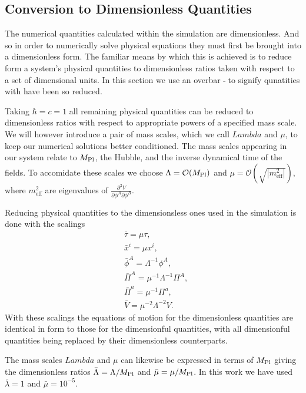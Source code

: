 

\subsection{Conversion to Dimensionless Quantities}
The numerical quantities calculated within the simulation are dimensionless. And so in order to numerically solve physical equations they must first be brought into a dimensionless form. The familiar means by which this is achieved is to reduce form a system's physical quantities to dimensionless ratios taken with respect to a set of dimensional units. In this section we use an overbar $\bar{}$ to signify qunatities with have been so reduced.

Taking $\hbar=c=1$ all remaining physical quantities can be reduced to dimensionless ratios with respect to appropriate powers of a specified mass scale. We will however introduce a pair of mass scales, which we call $Lambda$ and $\mu$, to keep our numerical solutions better conditioned. The mass scales appearing in our system relate to $M_{\mathrm{Pl}}$, the Hubble, and the inverse dynamical time of the fields. To accomidate these scales we choose $\Lambda = \mathcal{O}(M_{\mathrm{Pl}})$ and $\mu = \mathcal{O}(\sqrt{|m^2_\mathrm{eff}|})$, where $m^2_\mathrm{eff}$ are eigenvalues of $\frac{\partial^2 V}{\partial\phi^A\partial\phi^B}$.

Reducing physical quantities to the dimensionsless ones used in the simulation is done with the scalings
\begin{align}
  & \bar{\tau} = \mu\tau, \\
  & \bar{x}^i = \mu x^i, \\ 
  & \bar{\phi}^A = \Lambda^{-1}\phi^A, \\
  & \bar{\Pi}^A = \mu^{-1}\Lambda^{-1}\Pi^A, \\
  & \bar{\Pi}^a = \mu^{-1}\Pi^a, \\
  & \bar{V} = \mu^{-2}\Lambda^{-2}V.
\end{align}
With these scalings the equations of motion for the dimensionless quantities are identical in form to those for the dimensionful quantities, with all dimensionful quantities being replaced by their dimensionless counterparts.

The mass scales $Lambda$ and $\mu$ can likewise be expressed in terms of $M_{\mathrm{Pl}}$ giving the dimensionless ratios $\bar{\Lambda} = \Lambda/M_{\mathrm{Pl}}$ and $\bar{\mu} = \mu/M_{\mathrm{Pl}}$. In this work we have used $\bar{\lambda} = 1$ and $\bar{\mu} = 10^{-5}$.
